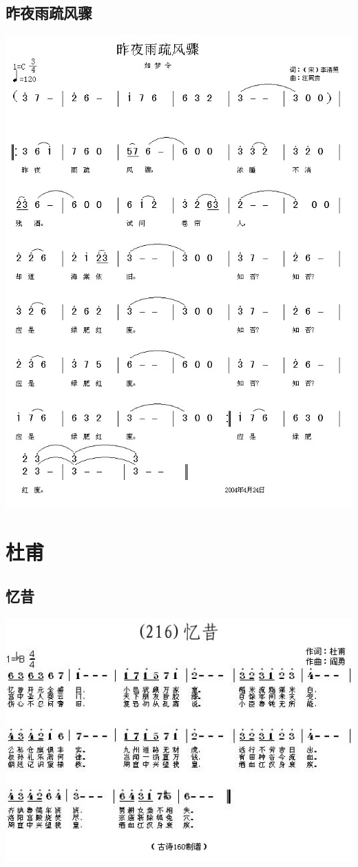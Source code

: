 \documentclass[cn,pad,twocol]{elegantbook}
\begin{document}
\section{昨夜雨疏风骤}  \includegraphics[width=\textwidth]{dongxiao/20200808-昨夜雨疏风骤-李清照.jpg}    
   
\chapter{杜甫}
\section{忆昔}          \includegraphics[width=\textwidth]{dongxiao/20200808-忆昔-杜甫.jpg} 
\end{document}
